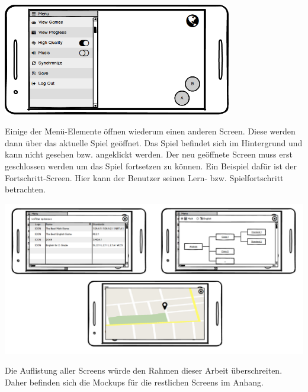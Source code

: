 			\begin{center}
				\includegraphics[width=10cm]{pics/Menu.png}
			\end{center}
			
			Einige der Menü-Elemente öffnen wiederum einen anderen Screen. Diese werden dann über das aktuelle Spiel geöffnet. Das Spiel befindet sich im Hintergrund und kann nicht gesehen bzw. angeklickt werden. Der neu geöffnete Screen muss erst geschlossen werden um das Spiel fortsetzen zu können. Ein Beispiel dafür ist der Fortschritt-Screen. Hier kann der Benutzer seinen Lern- bzw. Spielfortschritt betrachten.
			
			\begin{center}
				\includegraphics[width=\textwidth]{pics/NewWindows.png}
			\end{center}
			
			Die Auflistung aller Screens würde den Rahmen dieser Arbeit überschreiten. Daher befinden sich die Mockups für die restlichen Screens im Anhang.
						
			
		
